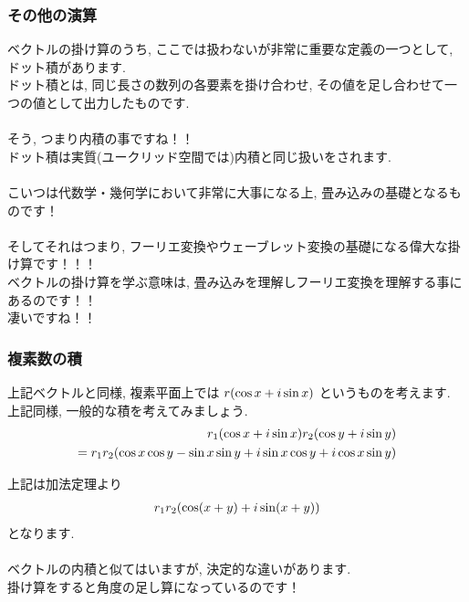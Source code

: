 \documentclass[11pt,a4paper]{jsarticle}
\begin{document}
\subsubsection{その他の演算}
ベクトルの掛け算のうち, ここでは扱わないが非常に重要な定義の一つとして, ドット積があります. \\
ドット積とは, 同じ長さの数列の各要素を掛け合わせ, その値を足し合わせて一つの値として出力したものです.\\
\\
そう, つまり内積の事ですね！！\\
ドット積は実質(ユークリッド空間では)内積と同じ扱いをされます.\\
\\
こいつは代数学・幾何学において非常に大事になる上, 畳み込みの基礎となるものです！\\
\\
そしてそれはつまり, フーリエ変換やウェーブレット変換の基礎になる偉大な掛け算です！！！
\\
ベクトルの掛け算を学ぶ意味は, 畳み込みを理解しフーリエ変換を理解する事にあるのです！！\\
凄いですね！！\\

\subsubsection{複素数の積}
上記ベクトルと同様, 複素平面上では $\mathstrut r (\cos x + \mathstrut i\sin x)$ というものを考えます.\\
上記同様, 一般的な積を考えてみましょう.\\

\begin{eqnarray}
\begin{split}
\mathstrut r_1(\cos x + \mathstrut i\sin x)\mathstrut r_2(\cos y + \mathstrut i\sin y)\\
= \mathstrut r_1\mathstrut r_2(\cos x\cos y - \sin x\sin y + \mathstrut i\sin x \cos y + \mathstrut i\cos x\sin y)
\end{split}
\end{eqnarray}

上記は加法定理より
\begin{eqnarray}
\mathstrut r_1\mathstrut r_2(\cos (\mathstrut x + \mathstrut y) + \mathstrut i\sin (\mathstrut x + \mathstrut y))
\end{eqnarray}
となります.\\
\\
ベクトルの内積と似てはいますが, 決定的な違いがあります.\\
掛け算をすると角度の足し算になっているのです！\\
\end{document}
